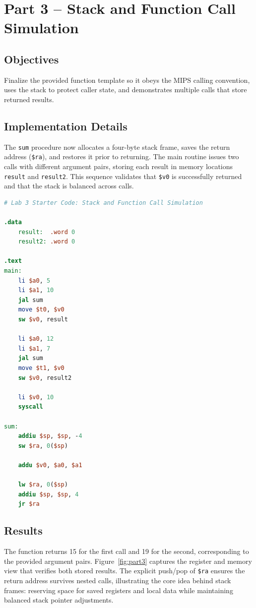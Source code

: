 \documentclass[11pt]{article}
\begin{document}
\newpage
\section{Part 3 -- Stack and Function Call Simulation}
\subsection*{Objectives}
Finalize the provided function template so it obeys the MIPS calling convention, uses the stack to protect caller state, and demonstrates multiple calls that store returned results.

\subsection*{Implementation Details}
The \texttt{sum} procedure now allocates a four-byte stack frame, saves the return address (\texttt{\$ra}), and restores it prior to returning. The main routine issues two calls with different argument pairs, storing each result in memory locations \texttt{result} and \texttt{result2}. This sequence validates that \texttt{\$v0} is successfully returned and that the stack is balanced across calls.

\begin{lstlisting}[language=MIPS, caption={Part~3 solution (\texttt{part3\_Solution.asm})}, label=lst:part3]
# Lab 3 Starter Code: Stack and Function Call Simulation

.data
    result:  .word 0
    result2: .word 0

.text
main:
    li $a0, 5
    li $a1, 10
    jal sum
    move $t0, $v0
    sw $v0, result

    li $a0, 12
    li $a1, 7
    jal sum
    move $t1, $v0
    sw $v0, result2

    li $v0, 10
    syscall

sum:
    addiu $sp, $sp, -4
    sw $ra, 0($sp)

    addu $v0, $a0, $a1

    lw $ra, 0($sp)
    addiu $sp, $sp, 4
    jr $ra
\end{lstlisting}

\newpage
\subsection*{Results}
The function returns 15 for the first call and 19 for the second, corresponding to the provided argument pairs. Figure~\ref{fig:part3} captures the register and memory view that verifies both stored results. The explicit push/pop of \texttt{\$ra} ensures the return address survives nested calls, illustrating the core idea behind stack frames: reserving space for saved registers and local data while maintaining balanced stack pointer adjustments.
\end{document}
